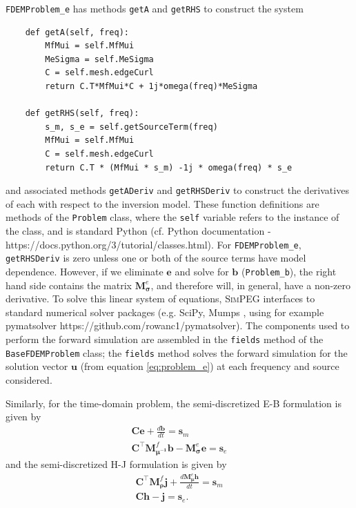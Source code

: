 \documentclass[preprint,review,3p,times,onecolumn,authoryear]{elsarticle}
\newcommand{\SimPEG}{\textsc{SimPEG}\xspace}
\newcommand{\Problem}{\texttt{Problem}\xspace}
\newcommand{\FDEM}{\texttt{FDEM}\xspace}
\newcommand{\sm}{\mathbf{s}_m}
\newcommand{\se}{\mathbf{s}_e}
\newcommand{\dcurl}{{\mathbf C}}
\newcommand{\M}{{\mathbf M}}
\newcommand{\MfMui}{{\M^f_{\boldsymbol{\mu^{-1}}}}}
\newcommand{\MfRho}{{\M^f_{\boldsymbol{\rho}}}}
\newcommand{\MeSigma}{{\M^e_{\boldsymbol{\sigma}}}}
\newcommand{\MeMu}{{\M^e_{\boldsymbol{\mu}}}}
\begin{document}
\FDEM \texttt{Problem\_e} has methods \texttt{getA} and \texttt{getRHS} to construct the system
{\scriptsize
\begin{multicols}{2}
\begin{verbatim}
    def getA(self, freq):
        MfMui = self.MfMui
        MeSigma = self.MeSigma
        C = self.mesh.edgeCurl
        return C.T*MfMui*C + 1j*omega(freq)*MeSigma

    def getRHS(self, freq):
        s_m, s_e = self.getSourceTerm(freq)
        MfMui = self.MfMui
        C = self.mesh.edgeCurl
        return C.T * (MfMui * s_m) -1j * omega(freq) * s_e
\end{verbatim}
\end{multicols}
}
\noindent
and associated methods \texttt{getADeriv} and \texttt{getRHSDeriv} to
construct the derivatives of each with respect to the inversion model. These
function definitions are methods of the \Problem class, where the
\texttt{self} variable refers to the instance of the class, and is standard
Python (cf. Python documentation -
https://docs.python.org/3/tutorial/classes.html). For
\FDEM \texttt{Problem\_e}, \texttt{getRHSDeriv} is zero unless one or both of
the source terms have model dependence. However, if we eliminate $\mathbf{e}$ and solve for $\mathbf{b}$ (\texttt{Problem\_b}), the
right hand side contains the matrix $\MeSigma$, and therefore will, in
general, have a non-zero derivative. To solve this linear system of equations,
\SimPEG interfaces to standard numerical solver packages (e.g. SciPy, Mumps
\citep{scipy, Amestoy2001, Amestoy2006}, using for example pymatsolver
https://github.com/rowanc1/pymatsolver). The components used to perform the forward simulation
are assembled in the
\texttt{fields} method of the \texttt{BaseFDEMProblem} class; the \texttt{fields} method solves the forward simulation for the solution vector $\mathbf{u}$ (from equation
\ref{eq:problem_e}) at each frequency and source considered.

Similarly, for the time-domain problem, the semi-discretized E-B formulation is given by
\begin{equation}
    \begin{split}
        \dcurl \mathbf{e} + \frac{d \mathbf{b}}{dt} = \sm \\
        \dcurl^\top \MfMui \mathbf{b} - \MeSigma \mathbf{e} = \se
    \end{split}
    \label{eq:EB_TDEM}
\end{equation}
and the semi-discretized H-J formulation is given by
\begin{equation}
    \begin{split}
        \dcurl^\top \MfRho \mathbf{j} + \frac{d \MeMu\mathbf{h}}{dt} = \sm \\
        \dcurl \mathbf{h} - \mathbf{j} = \se.
    \end{split}
    \label{eq:HJ_TDEM}
\end{equation}
\end{document}
